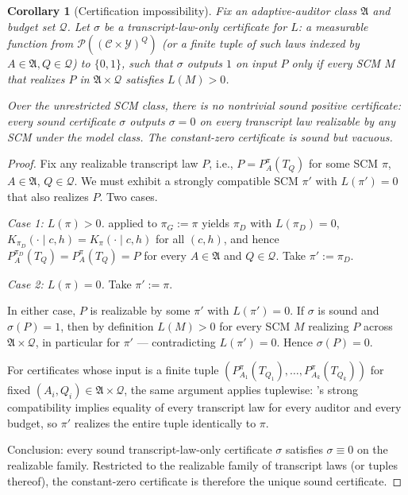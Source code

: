 \documentclass{article}
\theoremstyle{plain}
\newtheorem{corollary}[theorem]{Corollary}
\theoremstyle{definition}
\theoremstyle{remark}
\newcommand{\C}{\mathcal{C}}
\newcommand{\Y}{\mathcal{Y}}
\begin{document}
\begin{corollary}[Certification impossibility]\label{cor:cert-imp}
Fix an adaptive-auditor class $\mathfrak A$ and budget set $\mathcal Q$.
Let $\sigma$ be a \emph{transcript-law-only certificate} for $L$:
a measurable function from $\mathcal P((\C \times \Y)^Q)$
(or a finite tuple of such laws indexed by $A \in \mathfrak A, Q \in \mathcal Q$)
to $\{0, 1\}$, such that $\sigma$ outputs $1$ on input $P$ only if every SCM
$M$ that realizes $P$ in $\mathfrak{A} \times \mathcal Q$
satisfies $L(M) > 0$.

Over the unrestricted SCM class, there is \emph{no nontrivial sound positive
certificate}: every sound certificate $\sigma$ outputs $\sigma = 0$ on every
transcript law realizable by any SCM under the model class. The constant-zero
certificate is sound but vacuous.
\end{corollary}

\begin{proof}
Fix any realizable transcript law $P$, i.e., $P = P_A^{\pi}(T_Q)$ for some
SCM $\pi$, $A \in \mathfrak A$, $Q \in \mathcal Q$. We must exhibit a strongly
compatible SCM $\pi'$ with $L(\pi') = 0$ that also realizes $P$. Two cases.

\emph{Case 1: $L(\pi) > 0$.}  applied to $\pi_G := \pi$
yields $\pi_D$ with $L(\pi_D) = 0$, $K_{\pi_D}(\cdot \mid c, h) = K_\pi(\cdot \mid c, h)$
for all $(c, h)$, and hence $P_A^{\pi_D}(T_Q) = P_A^\pi(T_Q) = P$ for every
$A \in \mathfrak A$ and $Q \in \mathcal Q$. Take $\pi' := \pi_D$.

\emph{Case 2: $L(\pi) = 0$.} Take $\pi' := \pi$.

In either case, $P$ is realizable by some $\pi'$ with $L(\pi') = 0$.
If $\sigma$ is sound and $\sigma(P) = 1$, then by definition $L(M) > 0$
for every SCM $M$ realizing $P$ across $\mathfrak{A} \times \mathcal Q$, in
particular for $\pi'$ --- contradicting $L(\pi') = 0$. Hence $\sigma(P) = 0$.

For certificates whose input is a finite tuple
$(P_{A_1}^\pi(T_{Q_1}), \ldots, P_{A_k}^\pi(T_{Q_k}))$ for fixed
$(A_i, Q_i) \in \mathfrak A \times \mathcal Q$, the same argument applies
tuplewise: 's strong compatibility implies
equality of every transcript law for every auditor and every budget, so
$\pi'$ realizes the entire tuple identically to $\pi$.

Conclusion: every sound transcript-law-only certificate $\sigma$ satisfies
$\sigma \equiv 0$ on the realizable family. Restricted to the realizable
family of transcript laws (or tuples thereof), the constant-zero
certificate is therefore the unique sound certificate.
\end{proof}
\end{document}
